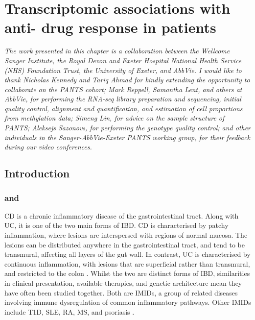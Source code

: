 %
%

\chapter{Transcriptomic associations with anti- drug response in  patients}
\label{ch:multiPANTS}

\textit{
    The work presented in this chapter is a collaboration between 
    the Wellcome Sanger Institute,
    the Royal Devon and Exeter Hospital National Health Service (NHS) Foundation Trust,
    the University of Exeter,
    and AbbVie.
    I would like to thank 
    Nicholas Kennedy and Tariq Ahmad for kindly extending the opportunity to collaborate on the PANTS cohort;
    Mark Reppell, Samantha Lent, and others at AbbVie, for performing the RNA-seq library preparation and sequencing, initial quality control, alignment and quantification, and estimation of cell proportions from methylation data;
    Simeng Lin, for advice on the sample structure of PANTS;
    Aleksejs Sazonovs, for performing the genotype quality control;
    and other individuals in the Sanger-AbbVie-Exeter PANTS working group, for their feedback during our video conferences.
}

\section{Introduction}

\subsection{ and }

\gls{CD} is a chronic inflammatory disease of the gastrointestinal tract.
Along with \gls{UC}, it is one of the two main forms of \gls{IBD}.
\gls{CD} is characterised by patchy inflammation, where lesions are interspersed with regions of normal mucosa. 
The lesions can be distributed anywhere in the gastrointestinal tract, and tend to be transmural, affecting all layers of the gut wall.
In contrast, \gls{UC} is characterised by continuous inflammation, with lesions that are superficial rather than transmural, and restricted to the colon \autocite{roda2020CrohnDisease}.
Whilst the two are distinct forms of \gls{IBD}, similarities in clinical presentation, available therapies, and genetic architecture mean they have often been studied together.
Both are \glspl{IMID}, a group of related diseases involving immune dysregulation of common inflammatory pathways.
Other \glspl{IMID} include \gls{T1D}, \gls{SLE}, \gls{RA}, \gls{MS}, and psoriasis \autocite{cotsapas2013ImmunemediatedDiseaseGenetics,david2018GeneticsImmunemediatedInflammatory}.

